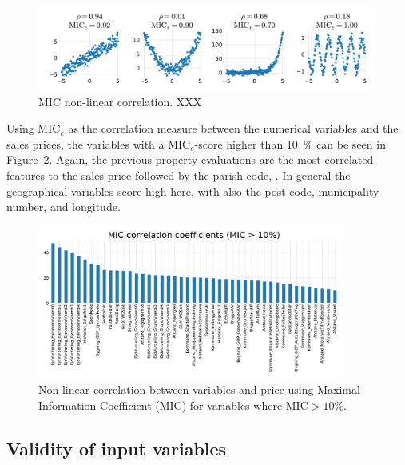 \begin{figure}
  \centering
  \includegraphics[width=0.99\textwidth, trim=10 10 10 10, clip]{figures/housing/MIC_test_small.pdf}
  \caption[MIC non-linear correlation.]
          {MIC non-linear correlation. XXX \TODO}
  \label{fig:h:MIC_example_small}
\end{figure}

Using $\mathrm{MIC}_e$ as the correlation measure between the numerical variables and the sales prices, the variables with a $\mathrm{MIC}_e$-score higher than \SI{10}{\percent} can be seen in Figure~\ref{fig:h:corr_MIC}. Again, the previous property evaluations are the most correlated features to the sales price followed by the parish code, . In general the geographical variables score high here, with also the post code, municipality number, and longitude. 

\begin{figure}
  \includegraphics[width=0.9\textwidth, trim=0 0 0 40, clip]{figures/housing/MIC_plot.pdf}
  \caption[Non-linear correlation between variables and price]
          {Non-linear correlation between variables and price using Maximal Information Coefficient (MIC) for variables where $\text{MIC}>10\%$.}
  \label{fig:h:corr_MIC}
\end{figure}

\subsection{Validity of input variables}


